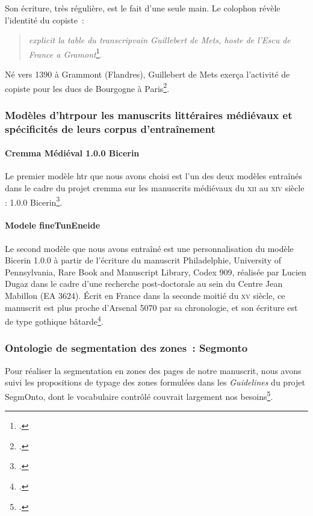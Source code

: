 \documentclass{article}
\newcommand{\siecle}[1]{\textsc{#1}\ieme}
\begin{document}
	Son écriture, très régulière, est le fait d'une seule main. Le colophon révèle l'identité du copiste~: \begin{quote}
		\textit{explicit la table du transcripvain Guillebert de Mets, hoste de l'Escu de France a Gramont}\footcite{irhtsectionromaneNoticeParisBibliotheque2012}.
	\end{quote}Né vers 1390 à Grammont (Flandres), Guillebert de Mets exerça l'activité de copiste pour les ducs de Bourgogne à Paris\footcite{irhtsectionromaneGuillebertMets}. 
	
	\subsubsection{Modèles d'\gls{htr}pour les manuscrits littéraires médiévaux et spécificités de leurs corpus d'entraînement}
	\paragraph{Cremma Médiéval 1.0.0 Bicerin}
	Le premier modèle \gls{htr} que nous avons choisi est l'un des deux modèles entraînés dans le cadre du projet \gls{cremma} sur les manuscrits médiévaux du \siecle{xii} au \siecle{xiv} siècle : 1.0.0 Bicerin\footcite{pincheCREMMAMedievalOld2021}.
	
	\paragraph{Modele fineTunEneide}
	Le second modèle que nous avons entraîné est une personnalisation du modèle Bicerin 1.0.0 à partir de l'écriture du manuscrit Philadelphie, University of Pennsylvania, Rare Book and Manuscript Library, Codex 909, réalisée par Lucien Dugaz dans le cadre d'une recherche post-doctorale au sein du Centre Jean Mabillon (EA 3624). Écrit en France dans la seconde moitié du \siecle{xv} siècle, ce manuscrit est plus proche d'Arsenal 5070 par sa chronologie, et son écriture est de type gothique bâtarde\footcite{dugazEditionCritiqueNumerique2021, pennlibrariesMedievalRenaissanceManuscripts}.
	
	\subsubsection{Ontologie de segmentation des zones~: Segmonto}
	Pour réaliser la segmentation en zones des pages de notre manuscrit, nous avons suivi les propositions de typage des zones formulées dans les \textit{Guidelines} du projet SegmOnto, dont le vocabulaire contrôlé couvrait largement nos besoins\footcite{campsSegmOntoGuidelines2021}.
	
\end{document}
